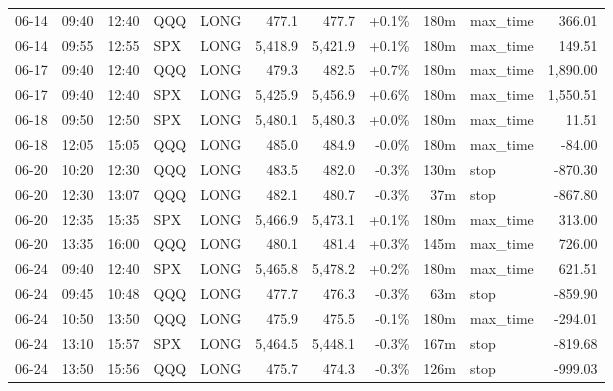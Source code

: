 \documentclass[11pt,a4paper,twoside]{article}
\begin{document}
\begin{center}
\begin{longtable}{>{\color{txtmain}}l l l l l r r r r >{\color{txtmain}}l r}
06-14 & 09:40 & 12:40 & QQQ & LONG & 477.1 & 477.7 & \textcolor{wingreen}{+0.1\%} & 180m & max\_time & \textcolor{wingreen}{366.01} \\
06-14 & 09:55 & 12:55 & SPX & LONG & 5,418.9 & 5,421.9 & \textcolor{wingreen}{+0.1\%} & 180m & max\_time & \textcolor{wingreen}{149.51} \\
06-17 & 09:40 & 12:40 & QQQ & LONG & 479.3 & 482.5 & \textcolor{wingreen}{+0.7\%} & 180m & max\_time & \textcolor{wingreen}{1,890.00} \\
06-17 & 09:40 & 12:40 & SPX & LONG & 5,425.9 & 5,456.9 & \textcolor{wingreen}{+0.6\%} & 180m & max\_time & \textcolor{wingreen}{1,550.51} \\
06-18 & 09:50 & 12:50 & SPX & LONG & 5,480.1 & 5,480.3 & \textcolor{wingreen}{+0.0\%} & 180m & max\_time & \textcolor{wingreen}{11.51} \\
06-18 & 12:05 & 15:05 & QQQ & LONG & 485.0 & 484.9 & \textcolor{lossred}{-0.0\%} & 180m & max\_time & \textcolor{lossred}{-84.00} \\
06-20 & 10:20 & 12:30 & QQQ & LONG & 483.5 & 482.0 & \textcolor{lossred}{-0.3\%} & 130m & stop & \textcolor{lossred}{-870.30} \\
06-20 & 12:30 & 13:07 & QQQ & LONG & 482.1 & 480.7 & \textcolor{lossred}{-0.3\%} & 37m & stop & \textcolor{lossred}{-867.80} \\
06-20 & 12:35 & 15:35 & SPX & LONG & 5,466.9 & 5,473.1 & \textcolor{wingreen}{+0.1\%} & 180m & max\_time & \textcolor{wingreen}{313.00} \\
06-20 & 13:35 & 16:00 & QQQ & LONG & 480.1 & 481.4 & \textcolor{wingreen}{+0.3\%} & 145m & max\_time & \textcolor{wingreen}{726.00} \\
06-24 & 09:40 & 12:40 & SPX & LONG & 5,465.8 & 5,478.2 & \textcolor{wingreen}{+0.2\%} & 180m & max\_time & \textcolor{wingreen}{621.51} \\
06-24 & 09:45 & 10:48 & QQQ & LONG & 477.7 & 476.3 & \textcolor{lossred}{-0.3\%} & 63m & stop & \textcolor{lossred}{-859.90} \\
06-24 & 10:50 & 13:50 & QQQ & LONG & 475.9 & 475.5 & \textcolor{lossred}{-0.1\%} & 180m & max\_time & \textcolor{lossred}{-294.01} \\
06-24 & 13:10 & 15:57 & SPX & LONG & 5,464.5 & 5,448.1 & \textcolor{lossred}{-0.3\%} & 167m & stop & \textcolor{lossred}{-819.68} \\
06-24 & 13:50 & 15:56 & QQQ & LONG & 475.7 & 474.3 & \textcolor{lossred}{-0.3\%} & 126m & stop & \textcolor{lossred}{-999.03} \\

\end{longtable}
\end{center}
\end{document}
